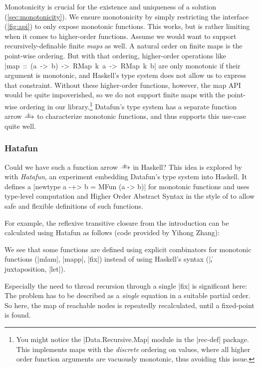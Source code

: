 \documentclass[manuscript,screen,acmsmall,nonacm]{acmart}
\begin{document}
\newcommand{\mfun}{\xrightarrow{\raisebox{-3pt}[0pt][0pt]{+}}}

Monotonicity is crucial for the existence and uniqueness of a solution (\cref{sec:monotonicity}). We ensure monotonicity by simply restricting the interface (\cref{fig:api}) to only expose monotonic functions. This works, but is rather limiting when it comes to higher-order functions. Assume we would want to support recursively-definable finite \emph{maps} as well. A natural order on finite maps is the point-wise ordering. But with that ordering, higher-order operations like \mbox{|map :: (a -> b) -> RMap k a -> RMap k b|} are only monotonic if their argument is monotonic, and Haskell's type system does not allow us to express that constraint. Without these higher-order functions, however, the map API would be quite impoverished, so we do not support finite maps with the point-wise ordering in our library.\footnote{You might notice the |Data.Recursive.Map| module in the |rec-def| package. This implements maps with the \emph{discrete} ordering on values, where all higher order function arguments are vacuously monotonic, thus avoiding this issue.} Datafun's type system has a separate function arrow $\mfun$ to characterize monotonic functions, and thus supports this use-case quite well.

\subsubsection{Hatafun}\label{sec:hatafun}

Could we have such a function arrow $\mfun$ in Haskell? This idea is explored by \citet{hatafun} with \emph{Hatafun}, an experiment embedding Datafun's type system into Haskell. It defines a |newtype a -+> b = MFun (a -> b)| for monotonic functions and uses type-level computation and Higher Order Abstract Syntax in the style of \citet{polakow} to allow safe and flexible definitions of such functions.

For example, the reflexive transitive closure from the introduction can be calculated using Hatafun as follows (code provided by Yihong Zhang):


We see that some functions are defined using explicit combinators for monotonic functions (|mlam|, |mapp|, |fix|) instead of using Haskell's syntax (|\|, juxtaposition, |let|).

Especially the need to thread recursion through a single |fix| is significant here: The problem has to be described as a \emph{single} equation in a suitable partial order. So here, the map of reachable nodes is repeatedly recalculated, until a fixed-point is found.
\end{document}
